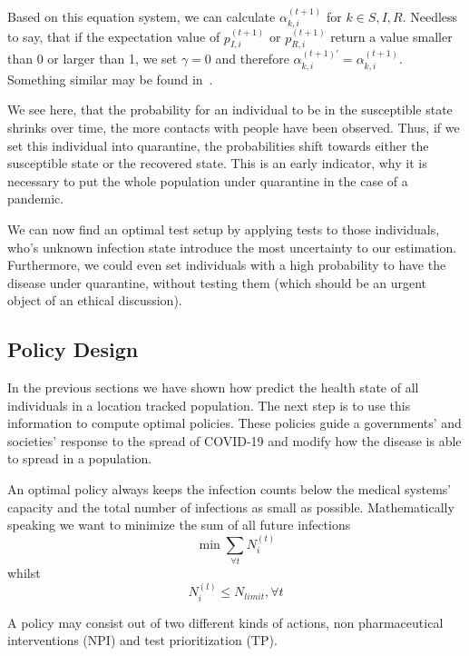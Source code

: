 Based on this equation system, we can calculate $\alpha_{k,i}^{(t+1)}$ for $k\in{S,I,R}$. Needless to say, that if the expectation value of $p_{I,i}^{(t+1)}$ or $p_{R,i}^{(t+1)}$ return a value smaller than 0 or larger than 1, we set $\gamma=0$ and therefore $\alpha_{k,i}^{(t+1)\prime}=\alpha_{k,i}^{(t+1)}$. Something similar may be found in~\cite{stojanovic2019bayesian}.

We see here, that the probability for an individual to be in the susceptible state shrinks over time, the more contacts with people have been observed. Thus, if we set this individual into quarantine, the probabilities shift towards either the susceptible state or the recovered state. This is an early indicator, why it is necessary to put the whole population under quarantine in the case of a pandemic.

We can now find an optimal test setup by applying tests to those individuals, who's unknown infection state introduce the most uncertainty to our estimation. Furthermore, we could even set individuals with a high probability to have the disease under quarantine, without testing them (which should be an urgent object of an ethical discussion).



\subsection{Policy Design}
In the previous sections we have shown how predict the health state of all individuals in a location tracked population.
The next step is to use this information to compute optimal policies.
These policies guide a governments' and societies' response to the spread of COVID-19 and modify how the disease is able to spread in a population.

An optimal policy always keeps the infection counts below the medical systems' capacity and the total number of infections as small as possible.
Mathematically speaking we want to minimize the sum of all future infections
\begin{equation}\label{eq:number-of-infected}
	\min \sum_{\forall t} N^{(t)}_i
\end{equation}
whilst
\begin{equation}\label{eq:cap-constraint}
	N^{(l)}_i \leq N_{limit}, \forall t
\end{equation}

A policy may consist out of two different kinds of actions, non pharmaceutical interventions (NPI) and test prioritization (TP).


